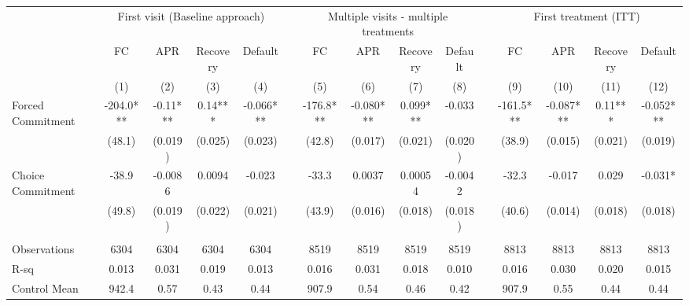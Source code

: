 \begin{tabular}{lcccccccccccccc}
\toprule
      & \multicolumn{4}{c}{First visit (Baseline approach)} &       & \multicolumn{4}{c}{Multiple visits - multiple treatments} &       & \multicolumn{4}{c}{First treatment (ITT)} \\
\cmidrule{7-10}\cmidrule{12-15}      & FC    & APR   & Recovery & Default &       & FC    & APR   & Recovery & Default &       & FC    & APR   & Recovery & Default \\
\midrule
      & (1)   & (2)   & (3)   & (4)   &       & (5)   & (6)   & (7)   & (8)   &       & (9)   & (10)  & (11)  & (12) \\
\midrule
\midrule
Forced Commitment & -204.0*** & -0.11*** & 0.14*** & -0.066*** &       & -176.8*** & -0.080*** & 0.099*** & -0.033 &       & -161.5*** & -0.087*** & 0.11*** & -0.052*** \\
      & (48.1) & (0.019) & (0.025) & (0.023) &       & (42.8) & (0.017) & (0.021) & (0.020) &       & (38.9) & (0.015) & (0.021) & (0.019) \\
Choice Commitment & -38.9 & -0.0086 & 0.0094 & -0.023 &       & -33.3 & 0.0037 & 0.00054 & -0.0042 &       & -32.3 & -0.017 & 0.029 & -0.031* \\
      & (49.8) & (0.019) & (0.022) & (0.021) &       & (43.9) & (0.016) & (0.018) & (0.018) &       & (40.6) & (0.014) & (0.018) & (0.018) \\
      &       &       &       &       &       &       &       &       &       &       &       &       &       &  \\
\midrule
Observations & 6304  & 6304  & 6304  & 6304  &       & 8519  & 8519  & 8519  & 8519  &       & 8813  & 8813  & 8813  & 8813 \\
R-sq  & 0.013 & 0.031 & 0.019 & 0.013 &       & 0.016 & 0.031 & 0.018 & 0.010 &       & 0.016 & 0.030 & 0.020 & 0.015 \\
Control Mean & 942.4 & 0.57  & 0.43  & 0.44  &       & 907.9 & 0.54  & 0.46  & 0.42  &       & 907.9 & 0.55  & 0.44  & 0.44 \\
\bottomrule
\bottomrule
\end{tabular}%
